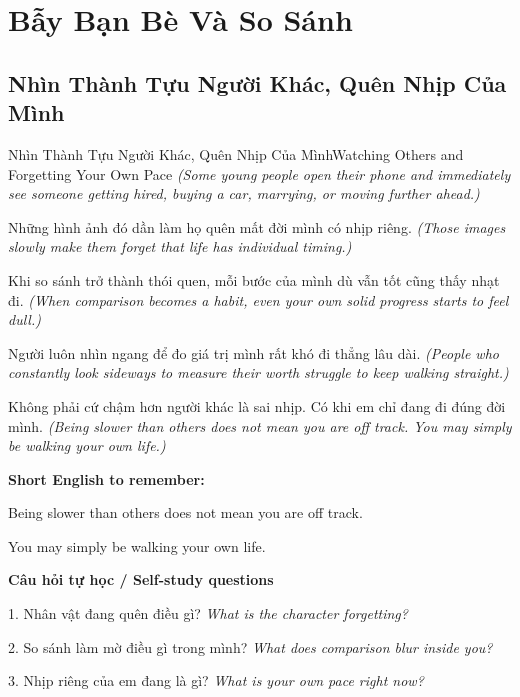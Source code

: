 \chapter{Bẫy Bạn Bè Và So Sánh}

\section{Nhìn Thành Tựu Người Khác, Quên Nhịp Của Mình}
\begin{truyen}{Nhìn Thành Tựu Người Khác, Quên Nhịp Của Mình}{Watching Others and Forgetting Your Own Pace}
\textit{(Some young people open their phone and immediately see someone getting hired, buying a car, marrying, or moving further ahead.)}

Những hình ảnh đó dần làm họ quên mất đời mình có nhịp riêng.
\textit{(Those images slowly make them forget that life has individual timing.)}

Khi so sánh trở thành thói quen, mỗi bước của mình dù vẫn tốt cũng thấy nhạt đi.
\textit{(When comparison becomes a habit, even your own solid progress starts to feel dull.)}

Người luôn nhìn ngang để đo giá trị mình rất khó đi thẳng lâu dài.
\textit{(People who constantly look sideways to measure their worth struggle to keep walking straight.)}

\end{truyen}

\begin{baihoc}
Không phải cứ chậm hơn người khác là sai nhịp. Có khi em chỉ đang đi đúng đời mình.
\textit{(Being slower than others does not mean you are off track. You may simply be walking your own life.)}
\end{baihoc}

\begin{ghinhoanh}
\textbf{Short English to remember:}

Being slower than others does not mean you are off track.

You may simply be walking your own life.

\end{ghinhoanh}

\begin{tuhocnhanh}
\textbf{Câu hỏi tự học / Self-study questions}

1. Nhân vật đang quên điều gì? \textit{What is the character forgetting?}

2. So sánh làm mờ điều gì trong mình? \textit{What does comparison blur inside you?}

3. Nhịp riêng của em đang là gì? \textit{What is your own pace right now?}
\end{tuhocnhanh}
\ngancach

